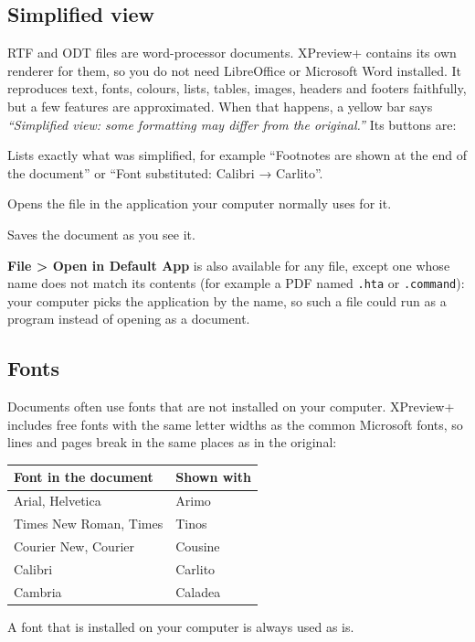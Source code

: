 \documentclass[11pt,a4paper]{article}
\newcommand{\app}{XPreview+}
\newcommand{\menu}[1]{\textsf{\textbf{#1}}}
\newcommand{\file}[1]{\texttt{#1}}
\begin{document}
\subsection{Simplified view}
RTF and ODT files are word-processor documents. \app{} contains its own renderer for them, so
you do not need LibreOffice or Microsoft Word installed. It reproduces text, fonts, colours, lists,
tables, images, headers and footers faithfully, but a few features are approximated. When
that happens, a yellow bar says
\emph{``Simplified view: some formatting may differ from the original.''} Its buttons are:
\begin{description}[style=nextline, leftmargin=2.2em, font=\sffamily\bfseries]
  \item[Details\ldots] Lists exactly what was simplified, for example ``Footnotes are shown at
        the end of the document'' or ``Font substituted: Calibri → Carlito''.
  \item[Open in Default App] Opens the file in the application your computer normally uses for it.
  \item[Export as PDF\ldots] Saves the document as you see it.
\end{description}
\menu{File > Open in Default App} is also available for any file, except one whose name does not
match its contents (for example a PDF named \file{.hta} or \file{.command}): your computer picks the
application by the name, so such a file could run as a program instead of opening as a document.

\subsection{Fonts}
Documents often use fonts that are not installed on your computer. \app{} includes free fonts
with the same letter widths as the common Microsoft fonts, so lines and pages break in the same
places as in the original:

\begin{center}
\begin{tabular}{ll}
\toprule
\textbf{Font in the document} & \textbf{Shown with} \\
\midrule
Arial, Helvetica & Arimo \\
Times New Roman, Times & Tinos \\
Courier New, Courier & Cousine \\
Calibri & Carlito \\
Cambria & Caladea \\
\bottomrule
\end{tabular}
\end{center}
A font that is installed on your computer is always used as is.
\end{document}
